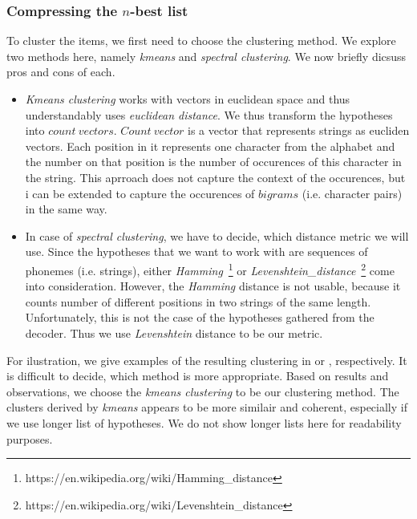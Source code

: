 \subsubsection{Compressing the $n$-best list}
To cluster the items, we first need to choose the clustering method.
We explore two methods here, namely \textit{kmeans} and \textit{spectral clustering}.
We now briefly dicsuss pros and cons of each.
\begin{itemize}
\item \textit{Kmeans clustering} works with vectors in euclidean space and thus understandably uses \textit{euclidean distance}.
We thus transform the hypotheses into $count\: vectors$.
$Count\:vector$ is a vector that represents strings as eucliden vectors.
Each position in it represents one character from the alphabet and the number on that position is the number of occurences of this character in the string.
This aprroach does not capture the context of the occurences, but i can be extended to capture the occurences of $bigrams$ (i.e. character pairs) in the same way.
\item In case of \textit{spectral clustering}, we have to decide, which distance metric we will use.
Since the hypotheses that we want to work with are sequences of phonemes (i.e. strings), either \textit{Hamming}~\footnote{https://en.wikipedia.org/wiki/Hamming\_distance} or \textit{Levenshtein\_distance}~\footnote{https://en.wikipedia.org/wiki/Levenshtein\_distance} come into consideration.
However, the \textit{Hamming} distance is not usable, because it counts number of different positions in two strings of the same length.
Unfortunately, this is not the case of the hypotheses gathered from the decoder.
Thus we use \textit{Levenshtein} distance to be our metric.
\end{itemize}
\par
For ilustration, we give examples of the resulting clustering in  or , respectively.
It is difficult to decide, which method is more appropriate.
Based on results and observations, we choose the \textit{kmeans clustering} to be our clustering method.
The clusters derived by \textit{kmeans} appears to be more similair and coherent, especially if we use longer list of hypotheses.
We do not show longer lists here for readability purposes.
